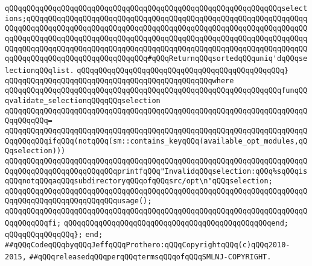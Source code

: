 \newline
\verb|qQQqqQQqqQQqqQQqqQQqqQQqqQQqqQQqqQQqqQQqqQQqqQQqqQQqqQQqqQQqqQQqselections;qQQqqQQqqQQqqQQqqQQqqQQqqQQqqQQqqQQqqQQqqQQqqQQqqQQqqQQqqQQqqQQqqQQqqQQqqQQqqQQqqQQqqQQqqQQqqQQqqQQqqQQqqQQqqQQqqQQqqQQqqQQqqQQqqQQqqQQqqQQqqQQqqQQqqQQqqQQqqQQqqQQqqQQqqQQqqQQqqQQqqQQqqQQqqQQqqQQqqQQqqQQqqQQqqQQqqQQqqQQqqQQqqQQqqQQqqQQqqQQqqQQqqQQqqQQqqQQqqQQqqQQqqQQqqQQqqQQqqQQqqQQqqQQqqQQqqQQqqQQqqQQqqQQq#qQQqReturnqQQqsortedqQQquniq'dqQQqselectionqQQqlist.|\newline
\verb|qQQqqQQqqQQqqQQqqQQqqQQqqQQqqQQqqQQqqQQqqQQqqQQq}|\newline
\verb|qQQqqQQqqQQqqQQqqQQqqQQqqQQqqQQqqQQqqQQqqQQqqQQqwhere|\newline
\verb|qQQqqQQqqQQqqQQqqQQqqQQqqQQqqQQqqQQqqQQqqQQqqQQqqQQqqQQqqQQqqQQqfunqQQqvalidate_selectionqQQqqQQqselection|\newline
\verb|qQQqqQQqqQQqqQQqqQQqqQQqqQQqqQQqqQQqqQQqqQQqqQQqqQQqqQQqqQQqqQQqqQQqqQQqqQQqqQQq=|\newline
\verb|qQQqqQQqqQQqqQQqqQQqqQQqqQQqqQQqqQQqqQQqqQQqqQQqqQQqqQQqqQQqqQQqqQQqqQQqqQQqqQQqifqQQq(notqQQq(sm::contains_keyqQQq(available_opt_modules,qQQqselection)))|\newline
\verb|qQQqqQQqqQQqqQQqqQQqqQQqqQQqqQQqqQQqqQQqqQQqqQQqqQQqqQQqqQQqqQQqqQQqqQQqqQQqqQQqqQQqqQQqqQQqqQQqprintfqQQq"InvalidqQQqselection:qQQq%sqQQqisqQQqnotqQQqaqQQqsubdirectoryqQQqofqQQqsrc/opt\n"qQQqselection;|\newline
\verb|qQQqqQQqqQQqqQQqqQQqqQQqqQQqqQQqqQQqqQQqqQQqqQQqqQQqqQQqqQQqqQQqqQQqqQQqqQQqqQQqqQQqqQQqqQQqqQQqusage();|\newline
\verb|qQQqqQQqqQQqqQQqqQQqqQQqqQQqqQQqqQQqqQQqqQQqqQQqqQQqqQQqqQQqqQQqqQQqqQQqqQQqqQQqfi;|\newline
\verb|qQQqqQQqqQQqqQQqqQQqqQQqqQQqqQQqqQQqqQQqqQQqqQQqend;|\newline
\verb|qQQqqQQqqQQqqQQq};|\newline
\verb|end;|\newline
\newline
\newline
\verb|##qQQqCodeqQQqbyqQQqJeffqQQqProthero:qQQqCopyrightqQQq(c)qQQq2010-2015,|\newline
\verb|##qQQqreleasedqQQqperqQQqtermsqQQqofqQQqSMLNJ-COPYRIGHT.|\newline

